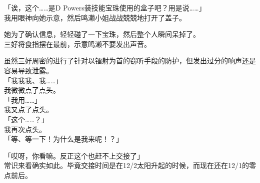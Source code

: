「诶，这个……是D Powers装技能宝珠使用的盒子吧？用是说……」\\

我用眼神向她示意，然后鸣濑小姐战战兢兢地打开了盖子。

她为了确认信息，轻轻碰了一下宝珠，然后整个人瞬间呆掉了。\\

三好将食指摆在最前，示意鸣濑不要发出声音。

虽然三好周密的进行了针对以镭射为首的窃听手段的防护，但发出过分的响声还是容易导致泄露。\\

「我我我、我……」\\

我微微点了点头。\\

「我用……」\\

我又点了点头。\\

「这个……？」\\

我再次点头。\\

「等、等一下！为什么是我来呢！？」

「哎呀，你看嘛。反正这个也赶不上交接了」\\

常识来看确实如此。毕竟交接时间是在12/2太阳升起的时候，而现在还在12/1的零点前后。\\

